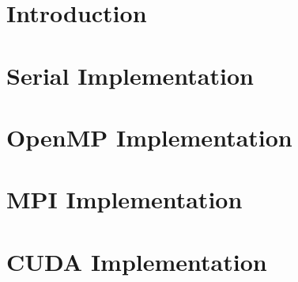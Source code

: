 \documentclass{article}
\author{Henry Milner}
\title
\date
\begin{document}
\maketitle

\section{Introduction}

\section{Serial Implementation}

\section{OpenMP Implementation}

\section{MPI Implementation}

\section{CUDA Implementation}
\end{document}
